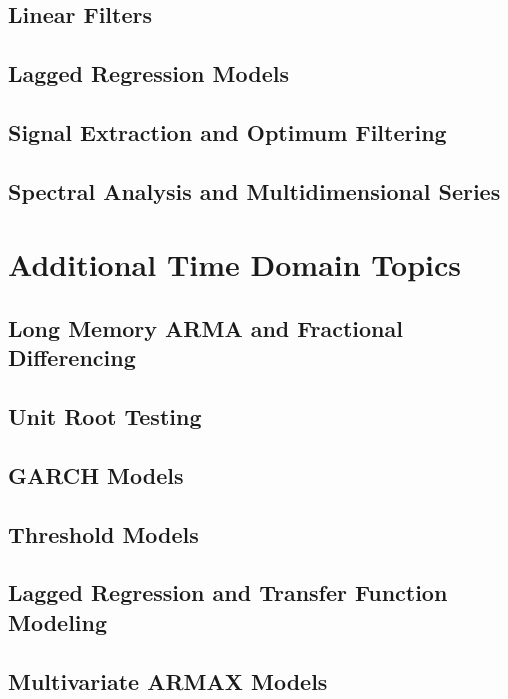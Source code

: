 \documentclass[12pt]{article}
\begin{document}
\subsection{Linear Filters}

\subsection{Lagged Regression Models}

\subsection{Signal Extraction and Optimum Filtering}

\subsection{Spectral Analysis and Multidimensional Series}


\section{Additional Time Domain Topics}
\subsection{Long Memory ARMA and Fractional Differencing}

\subsection{Unit Root Testing}

\subsection{GARCH Models}

\subsection{Threshold Models}

\subsection{Lagged Regression and Transfer Function Modeling}

\subsection{Multivariate ARMAX Models}
\end{document}
